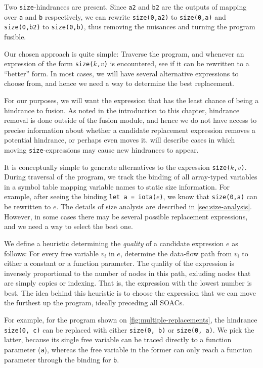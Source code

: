 Two \texttt{size}-hindrances are present.  Since \texttt{a2} and
\texttt{b2} are the outputs of mapping over \texttt{a} and \texttt{b}
respectively, we can rewrite \texttt{size(0,a2)} to \texttt{size(0,a)}
and \texttt{size(0,b2)} to \texttt{size(0,b)}, thus removing the
nuisances and turning the program fusible.

Our chosen approach is quite simple: Traverse the program, and
whenever an expression of the form \texttt{size($k$,$v$)} is
encountered, see if it can be rewritten to a ``better'' form.  In most
cases, we will have several alternative expressions to choose from,
and hence we need a way to determine the best replacement.

For our purposes, we will want the expression that has the least
chance of being a hindrance to fusion.  As noted in the introduction
to this chapter, hindrance removal is done outside of the fusion
module, and hence we do not have access to precise information about
whether a candidate replacement expression removes a potential
hindrance, or perhaps even moves it.
 will describe cases in which
moving \texttt{size}-expressions may cause new hindrances to appear.

It is conceptually simple to generate alternatives to the expression
\texttt{size($k$,$v$)}.  During traversal of the program, we track the
binding of all array-typed variables in a symbol table mapping
variable names to static size information.  For example, after seeing
the binding \texttt{let~a~=~iota($e$)}, we know that
\texttt{size(0,a)} can be rewritten to \texttt{$e$}.  The details of
size analysis are described in \cref{sec:size-analysis}.  However, in
some cases there may be several possible replacement expressions, and
we need a way to select the best one.

We define a heuristic determining the \textit{quality} of a candidate
expression $e$ as follows: For every free variable $v_{i}$ in $e$,
determine the data-flow path from $v_{i}$ to either a constant or a
function parameter.  The quality of the expression is inversely
proportional to the number of nodes in this path, exluding nodes that
are simply copies or indexing.  That is, the expression with the
lowest number is best.  The idea behind this heuristic is to choose
the expression that we can move the furthest up the program, ideally
preceding all SOACs.

For example, for the program shown on
\cref{fig:multiple-replacements}, the hindrance \texttt{size(0, c)}
can be replaced with either \texttt{size(0, b)} or \texttt{size(0,
  a)}.  We pick the latter, because its single free variable can be
traced directly to a function parameter (\texttt{a}), whereas the free
variable in the former can only reach a function parameter through the
binding for \texttt{b}.

